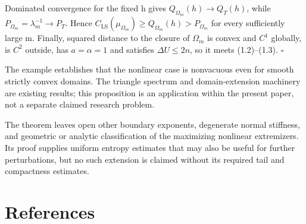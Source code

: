 \documentclass[11pt]{article}
\begin{document}
Dominated convergence for the fixed h gives
\(Q_{\Omega _m}(h)\to Q_T(h)\), while
\(P_{\Omega _m}=\lambda _m^{-1}\to P_T\). Hence
\(C_{\mathrm{LS}}(\mu _{\Omega _m})\geq Q_{\Omega _m}(h)>P_{\Omega _m}\)
for every sufficiently large m. Finally, squared distance to the closure
of \(\Omega _m\) is convex and \(C^{1}\) globally, is \(C^{2}\) outside,
has \(a=\alpha =1\) and satisfies \(\Delta U\leq 2n\), so it meets
(1.2)--(1.3). \(\square\)

The example establishes that the nonlinear case is nonvacuous even for
smooth strictly convex domains. The triangle spectrum and
domain-extension machinery are existing results; this proposition is an
application within the present paper, not a separate claimed research
problem.

The theorem leaves open other boundary exponents, degenerate normal
stiffness, and geometric or analytic classification of the maximizing
nonlinear extremizers. Its proof supplies uniform entropy estimates that
may also be useful for further perturbations, but no such extension is
claimed without its required tail and compactness estimates.

\sloppy\section{References}\label{references}
\end{document}
